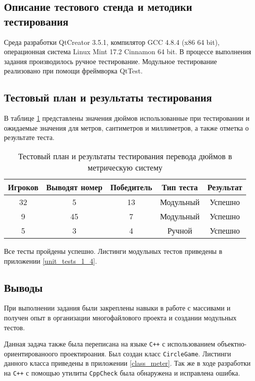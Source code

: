 \documentclass[12pt,a4paper]{report}
\begin{document}
\subsection{Описание тестового стенда и методики тестирования}
\hspace{\parindent}Среда разработки QtCreator 3.5.1, компилятор GCC 4.8.4 (x86 64 bit), операционная система Linux Mint 17.2 Cinnamon 64 bit.
В процессе выполнения задания производилось ручное тестирование.
Модульное тестирование реализовано при помощи фреймворка QtTest.

\subsection{Тестовый план и результаты тестирования}
\hspace{\parindent}В таблице \ref{inch_to_cm_test_plan} представлены значения дюймов использованные при тестировании и ожидаемые значения для метров, сантиметров и миллиметров, а также отметка о результате теста.
\FloatBarrier
\begin{table}[h]
\caption{Тестовый план и результаты тестирования перевода дюймов в метрическую систему}
\label{inch_to_cm_test_plan}
\begin{tabular}{| c c | c | c | c |}
\hline 
Игроков & Выводят номер & Победитель & Тип теста & Результат\\ 
\hline 
32 & 5 & 13 & Модульный & Успешно \\ 
\hline 
9 & 45 & 7 & Модульный & Успешно \\ 
\hline 
5 & 3 & 4 & Ручной & Успешно \\ 
\hline 
\end{tabular} 
\end{table}
\FloatBarrier
Все тесты пройдены успешно. Листинги модульных тестов приведены в приложении \ref{unit_tests_1_4}.
\subsection{Выводы}
\hspace{\parindent}При выполнении задания были закреплены навыки в работе с массивами и получен опыт в организации многофайлового проекта и создании модульных тестов.

Данная задача также была переписана на языке \verb|C++| с использованием объектно-ориентированоого проектироания. Был создан класс \verb+CircleGame+. Листинги данного класса приведены в приложении \ref{class_meter}. Так же в ходе разработки на \verb|C++| с помощью утилиты \verb+CppCheck+ была обнаружена и исправлена ошибка.
\end{document}
